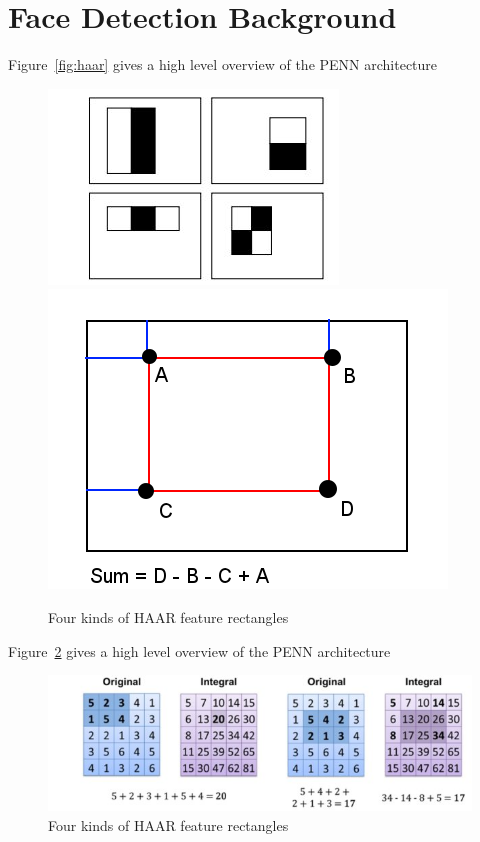 \section{Face Detection Background}\label{sec:arch}


Figure~\ref{fig:haar} gives a high level overview of the PENN architecture 

\begin{figure}[h]
  \includegraphics[width=0.45\linewidth]{figs/haar.jpg}
  \includegraphics[width=0.45\linewidth]{figs/sum.png}
  \caption{Four kinds of HAAR feature rectangles \textnormal{\small }  }
  \label{fig:penn-fabric}
\end{figure}


Figure~\ref{fig:add-table} gives a high level overview of the PENN architecture 

\begin{figure}
  \includegraphics[width=0.9\linewidth]{figs/add.jpg}
  \caption{Four kinds of HAAR feature rectangles \textnormal{\small }  }
  \label{fig:add-table}
\end{figure}

